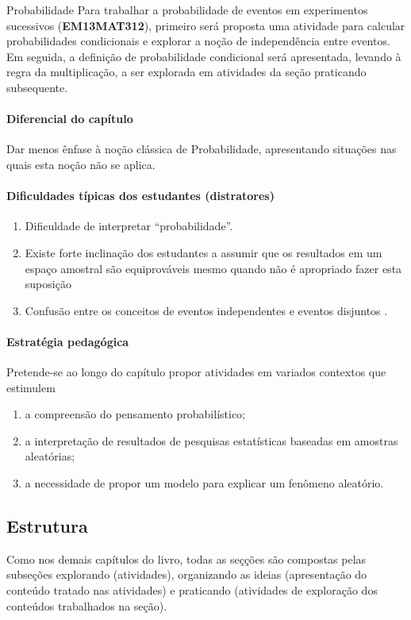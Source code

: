 \begin{apresentacao}{Probabilidade}
Para trabalhar a probabilidade de eventos em experimentos sucessivos (\textbf{EM13MAT312}), primeiro será proposta uma atividade para calcular probabilidades condicionais e explorar a noção de independência entre eventos. Em seguida, a definição de probabilidade condicional será apresentada, levando à regra da multiplicação, a ser explorada em atividades da seção praticando subsequente.

\paragraph{Diferencial do capítulo}
Dar menos ênfase à noção clássica de Probabilidade, apresentando situações nas quais esta noção não se aplica.

\paragraph{Dificuldades típicas dos estudantes (distratores)}
\begin{enumerate}
\item Dificuldade de interpretar “probabilidade”.
\item Existe forte inclinação dos estudantes a assumir que os resultados em um espaço amostral são equiprováveis mesmo quando não é apropriado fazer esta suposição \citep{albert2003}
\item Confusão entre os conceitos de eventos independentes e eventos disjuntos \citep{rodrighes1984}.
\end{enumerate}

\paragraph{Estratégia pedagógica}
Pretende-se ao longo do capítulo propor atividades em variados contextos que estimulem

\begin{enumerate}
\item a compreensão do pensamento probabilístico;
\item a interpretação de resultados de pesquisas estatísticas baseadas em amostras aleatórias;
\item a necessidade de propor um modelo para explicar um fenômeno aleatório.
\end{enumerate}

\subsection{Estrutura}
Como nos demais capítulos do livro, todas as seçções são compostas pelas subseções explorando (atividades), organizando as ideias (apresentação do conteúdo tratado nas atividades) e praticando (atividades de exploração dos conteúdos trabalhados na seção).


\end{apresentacao}
